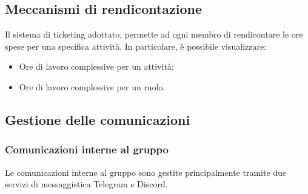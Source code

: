 \subsection{Meccanismi di rendicontazione}
Il sistema di ticketing adottato, permette ad ogni membro di rendicontare le ore spese per una specifica attività. In particolare, è possibile visualizzare:
\begin{itemize}
\item{Ore di lavoro complessive per un attività;}
\item{Ore di lavoro complessive per un ruolo.}
\end{itemize}



\subsection{Gestione delle comunicazioni}
\subsubsection{Comunicazioni interne al gruppo}
Le comunicazioni interne al gruppo sono gestite principalmente tramite due servizi di messaggistica Telegram e Discord.
